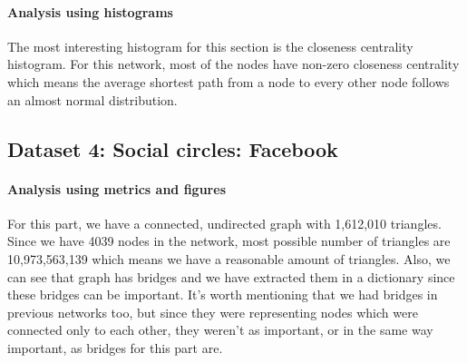 \documentclass[letterpaper, 11pt]{article}
\newcommand{\1}{\mathds{1}}	%
\theoremstyle{definition}
\begin{document}
\paragraph{Analysis using histograms}The most interesting histogram for this section is the closeness centrality histogram. For this network, most of the nodes have non-zero closeness centrality which means the average shortest path from a node to every other node follows an almost normal distribution.
\newpage
\subsection*{Dataset 4: Social circles: Facebook}
\paragraph{Analysis using metrics and figures}For this part, we have a connected, undirected graph with 1,612,010 triangles. Since we have 4039 nodes in the network, most possible number of triangles are 10,973,563,139 which means we have a reasonable amount of triangles. Also, we can see that graph has bridges and we have extracted them in a dictionary since these bridges can be important. It's worth mentioning that we had bridges in previous networks too, but since they were representing nodes which were connected only to each other, they weren't as important, or in the same way important, as bridges for this part are.
\end{document}
